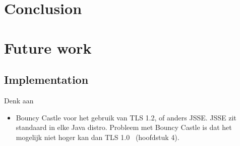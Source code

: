 \section{Conclusion}

\section{Future work}
\subsection{Implementation}
Denk aan
\begin{itemize}
	\item Bouncy Castle voor het gebruik van TLS 1.2, of anders JSSE. JSSE zit standaard in elke Java distro. Probleem met Bouncy Castle is dat het mogelijk niet hoger kan dan TLS 1.0~\cite{sslanalysis} (hoofdstuk 4). 
\end{itemize}

